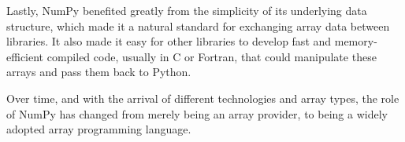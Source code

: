 Lastly, NumPy benefited greatly from the simplicity of its underlying data
structure, which made it a natural standard for exchanging array data between
libraries.  It also made it easy for other libraries to develop fast and
memory-efficient compiled code, usually in C or Fortran, that could manipulate
these arrays and pass them back to Python.

Over time, and with the arrival of different technologies and array types, the
role of NumPy has changed from merely being an array provider, to being a
widely adopted array programming language.

%
%
%
%
%

